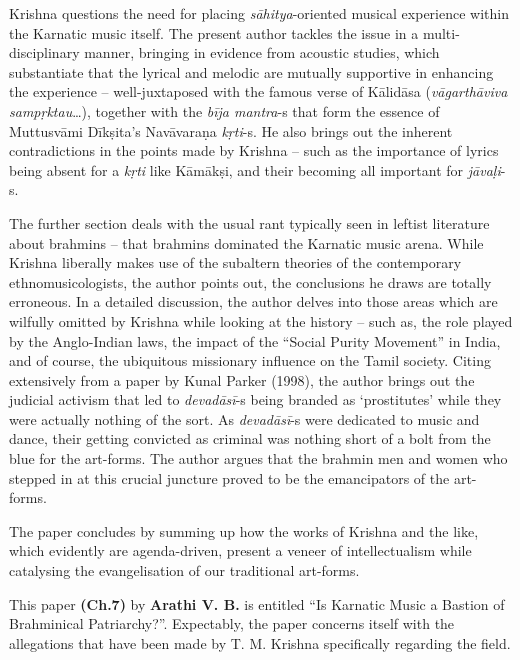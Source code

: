 Krishna questions the need for placing \textit{sāhitya}-oriented musical experience within the Karnatic music itself. The present author tackles the issue in a multi-disciplinary manner, bringing in evidence from acoustic studies, which substantiate that the lyrical and melodic are mutually supportive in enhancing the experience – well-juxtaposed with the famous verse of Kālidāsa (\textit{vāgarthāviva sampṛktau}…), together with the \textit{bīja mantra}-s that form the essence of Muttusvāmi Dīkṣita’s Navāvaraṇa \textit{kṛti}-s. He also brings out the inherent contradictions in the points made by Krishna – such as the importance of lyrics being absent for a \textit{kṛti} like Kāmākṣi, and their becoming all important for \textit{jāvaḷi}-s.

The further section deals with the usual rant typically seen in leftist literature about brahmins – that brahmins dominated the Karnatic music arena. While Krishna liberally makes use of the subaltern theories of the contemporary ethnomusicologists, the author points out, the conclusions he draws are totally erroneous. In a detailed discussion, the author delves into those areas which are wilfully omitted by Krishna while looking at the history – such as, the role played by the Anglo-Indian laws, the impact of the “Social Purity Movement” in India, and of course, the ubiquitous missionary influence on the Tamil society. Citing extensively from a paper by Kunal Parker (1998), the author brings out the judicial activism that led to \textit{devadāsī}-s being branded as ‘prostitutes’ while they were actually nothing of the sort. As \textit{devadāsī}-s were dedicated to music and dance, their getting convicted as criminal was nothing short of a bolt from the blue for the art-forms. The author argues that the brahmin men and women who stepped in at this crucial juncture proved to be the emancipators of the art-forms.

The paper concludes by summing up how the works of Krishna and the like, which evidently are agenda-driven, present a veneer of intellectualism while catalysing the evangelisation of our traditional art-forms.

This paper \textbf{(Ch.7)} by \textbf{Arathi V. B.} is entitled “Is Karnatic Music a Bastion of Brahminical Patriarchy?”. Expectably, the paper concerns itself with the allegations that have been made by T. M. Krishna specifically regarding the field.

